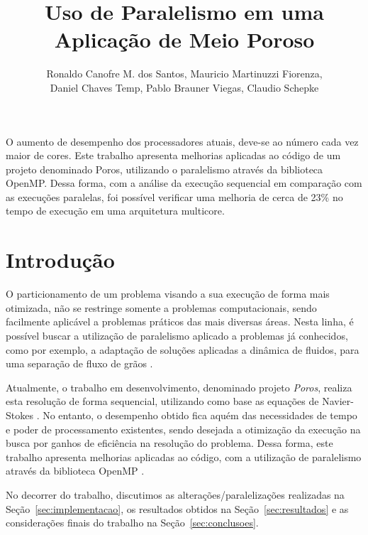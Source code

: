 \documentclass[12pt]{article}
\title{Uso de Paralelismo em uma Aplicação de Meio Poroso}
\author{Ronaldo Canofre M. dos Santos, Mauricio Martinuzzi Fiorenza, \\Daniel Chaves Temp, Pablo Brauner Viegas, Claudio Schepke}
\begin{document}
 
\maketitle

\begin{resumo}
O aumento de desempenho dos processadores atuais, deve-se ao número cada vez maior de cores. %
Este trabalho apresenta melhorias aplicadas ao código de um projeto denominado Poros, utilizando o paralelismo através da biblioteca OpenMP. Dessa forma, com a análise da execução sequencial em comparação com as execuções paralelas, foi possível verificar uma melhoria de cerca de 23\% no tempo de execução em uma arquitetura multicore.
\end{resumo}

\section{Introdução} \label{sec:intro}

O particionamento de um problema visando a sua execução de forma mais otimizada, não se restringe somente a problemas computacionais, sendo facilmente aplicável a problemas práticos das mais diversas áreas. Nesta linha, é possível buscar a utilização de paralelismo aplicado a problemas já conhecidos, como por exemplo, a adaptação de soluções aplicadas a dinâmica de fluidos, para uma separação de fluxo de grãos \cite{oliveira2020}.

Atualmente, o trabalho em desenvolvimento, denominado projeto \textit{Poros}, realiza esta resolução de forma sequencial, utilizando como base as equações de Navier-Stokes \cite{constantin1988navier}. No entanto, o desempenho obtido fica aquém das necessidades de tempo e poder de processamento existentes, sendo desejada a otimização da execução na busca por ganhos de eficiência na resolução do problema. Dessa forma, este trabalho apresenta melhorias aplicadas ao código, com a utilização de paralelismo através da biblioteca  OpenMP \cite{chandra2001parallel}.

No decorrer do trabalho, discutimos as alterações/paralelizações realizadas na Seção~\ref{sec:implementacao}, os resultados obtidos na Seção~\ref{sec:resultados} e %
as considerações finais do trabalho na Seção~\ref{sec:conclusoes}.
\end{document}
